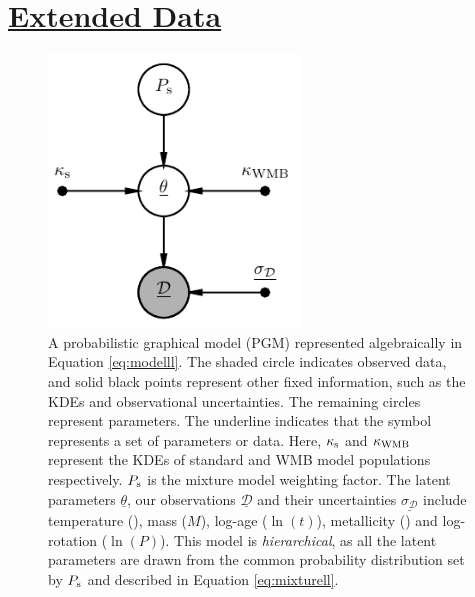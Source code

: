 \clearpage 
\section*{\underline{Extended Data}}

\begin{figure}[h!]
	\centering
	\includegraphics[width=0.6\textwidth]{pgm_models.pdf}
	\caption{A probabilistic graphical model (PGM) represented algebraically in Equation \ref{eq:modelll}. The shaded circle indicates observed data, and solid black points represent other fixed information, such as the KDEs and observational uncertainties. The remaining circles represent parameters. The underline indicates that the symbol represents a set of parameters or data. Here, $\kappa_{\rm{s}}$ and $\kappa_{\rm WMB}$ represent the KDEs of standard and WMB model populations respectively. $P_{\rm{s}}$ is the mixture model weighting factor. The latent parameters $\underline{\theta}$, our observations $\underline{\mathcal{D}}$ and their uncertainties $\underline{\sigma_{\mathcal{D}}}$ include temperature (\teff), mass ($M$), log-age ($\ln(t)$), metallicity (\feh) and log-rotation ($\ln(P)$). This model is \textit{hierarchical}, as all the latent parameters are drawn from the common probability distribution set by $P_{\rm{s}}$ and described in Equation \ref{eq:mixturell}.}
	\label{fig:pgm}
\end{figure}

